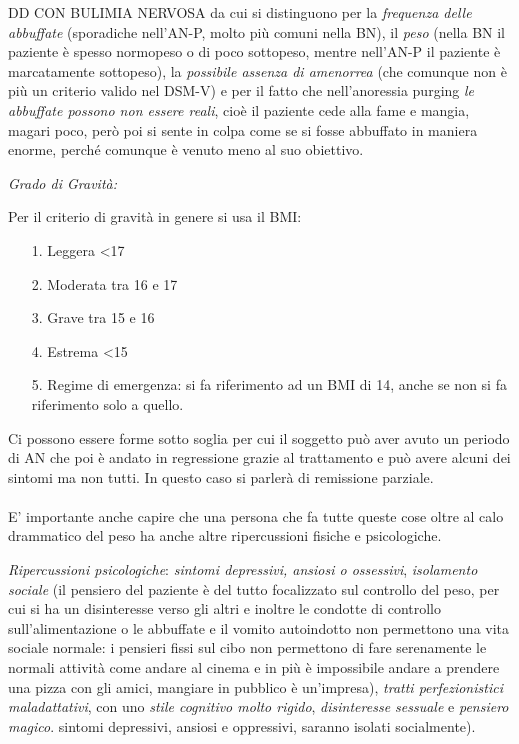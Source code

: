 DD CON BULIMIA NERVOSA da cui si distinguono per la \emph{frequenza
delle abbuffate} (sporadiche nell'AN-P, molto più comuni nella BN), il
\emph{peso} (nella BN il paziente è spesso normopeso o di poco
sottopeso, mentre nell'AN-P il paziente è marcatamente sottopeso), la
\emph{possibile assenza di amenorrea} (che comunque non è più un
criterio valido nel DSM-V) e per il fatto che nell'anoressia purging
\emph{le abbuffate possono non essere reali}, cioè il paziente cede alla
fame e mangia, magari poco, però poi si sente in colpa come se si fosse
abbuffato in maniera enorme, perché comunque è venuto meno al suo
obiettivo.

\emph{\emph{Grado di Gravità:}}

Per il criterio di gravità in genere si usa il BMI:

\begin{itemize}
\item[1.]
  Leggera \textless{}17
\item[2.]
  Moderata tra 16 e 17
\item[3.]
  Grave tra 15 e 16
\item[4.]
  Estrema \textless{}15
\item[5.]
  Regime di emergenza: si fa riferimento ad un BMI di 14, anche se non
  si fa riferimento solo a quello.
\end{itemize}

Ci possono essere forme sotto soglia per cui il soggetto può aver avuto
un periodo di AN che poi è andato in regressione grazie al trattamento e
può avere alcuni dei sintomi ma non tutti. In questo caso si parlerà di
remissione parziale.
\\\\
E' importante anche capire che una persona che fa tutte queste cose
oltre al calo drammatico del peso ha anche altre ripercussioni fisiche e
psicologiche.

\emph{\emph{Ripercussioni psicologiche}}: \emph{sintomi depressivi,
ansiosi o ossessivi}, \emph{isolamento sociale} (il pensiero del
paziente è del tutto focalizzato sul controllo del peso, per cui si ha
un disinteresse verso gli altri e inoltre le condotte di controllo
sull'alimentazione o le abbuffate e il vomito autoindotto non permettono
una vita sociale normale: i pensieri fissi sul cibo non permettono di
fare serenamente le normali attività come andare al cinema e in più è
impossibile andare a prendere una pizza con gli amici, mangiare in
pubblico è un'impresa), \emph{tratti perfezionistici maladattativi}, con
uno \emph{stile cognitivo molto rigido}, \emph{disinteresse sessuale} e
\emph{pensiero magico}. sintomi depressivi, ansiosi e oppressivi,
saranno isolati socialmente).

